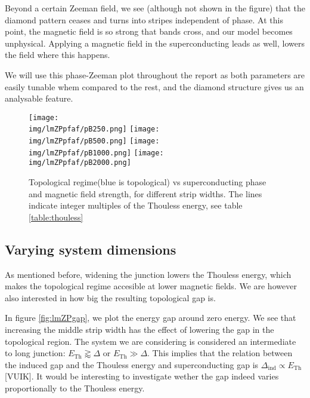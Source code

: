 \documentclass[10pt,a4paper]{article}
\newcommand{\img}{./images}
\begin{document}
		Beyond a certain Zeeman field, we see (although not shown in the figure) that the diamond pattern ceases and turns into stripes independent of phase.
		At this point, the magnetic field is so strong that bands cross, and our model becomes unphysical.
		Applying a magnetic field in the superconducting leads as well, lowers the field where this happens.
		
		We will use this phase-Zeeman plot throughout the report as both parameters are easily tunable whem compared to the rest, and the diamond structure gives us an analysable feature.
		
	\begin{figure}[H]
		\texttt{[image: \\img/lmZPpfaf/pB250.png]}
		\texttt{[image: \\img/lmZPpfaf/pB500.png]}
		\texttt{[image: \\img/lmZPpfaf/pB1000.png]}
		\texttt{[image: \\img/lmZPpfaf/pB2000.png]}
		\caption{Topological regime(blue is topological) vs superconducting phase and magnetic field strength, for different strip widths. The lines indicate integer multiples of the Thouless energy, see table \ref{table:thouless}}
		\label{fig:lmZPpfaf}
	\end{figure}

	\subsection{Varying system dimensions}
	 As mentioned before, widening the junction lowers the Thouless energy, which makes the topological regime accesible at lower magnetic fields.
	 We are however also interested in how big the resulting topological gap is.

	 
	 In figure \ref{fig:lmZPgap}, we plot the energy gap around zero energy.
	 We see that increasing the middle strip width has the effect of lowering the gap in the topological region.
	 The system we are considering is considered an intermediate to long junction: $E_\text{Th} \gtrapprox \Delta$ or $E_\text{Th} \gg \Delta$.
	 This implies that the relation between the induced gap and the Thouless energy and superconducting gap is $\Delta_\text{ind} \propto E_\text{Th}$[VUIK].
	 It would be interesting to investigate wether the gap indeed varies proportionally to the Thouless energy.
	 
\end{document}
